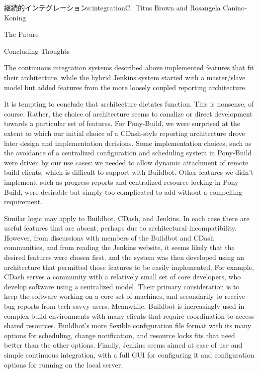 \begin{aosachapter}{継続的インテグレーション}{s:integration}{C.\ Titus Brown and Rosangela Canino-Koning}
\begin{aosasect1}{The Future}
\begin{aosadescription}
\end{aosadescription}

\begin{aosasect2}{Concluding Thoughts}

The continuous integration systems described above implemented
features that fit their architecture, while the hybrid Jenkins system
started with a master/slave model but added features from the more
loosely coupled reporting architecture.

It is tempting to conclude that architecture dictates function. This
is nonsense, of course. Rather, the choice of architecture seems to
canalize or direct development towards a particular set of
features. For Pony-Build, we were surprised at the extent to which our
initial choice of a CDash-style reporting architecture drove later
design and implementation decisions. Some implementation choices, such
as the avoidance of a centralized configuration and scheduling system
in Pony-Build were driven by our use cases: we needed to allow dynamic
attachment of remote build clients, which is difficult to support with
Buildbot. Other features we didn't implement, such as progress reports
and centralized resource locking in Pony-Build, were desirable but
simply too complicated to add without a compelling requirement.

Similar logic may apply to Buildbot, CDash, and Jenkins. In each case
there are useful features that are absent, perhaps due to
architectural incompatibility. However, from discussions with members
of the Buildbot and CDash communities, and from reading the Jenkins
website, it seems likely that the desired features were chosen first,
and the system was then developed using an architecture that permitted
those features to be easily implemented. For example, CDash serves a
community with a relatively small set of core developers, who develop
software using a centralized model. Their primary consideration is to
keep the software working on a core set of machines, and secondarily
to receive bug reports from tech-savvy users. Meanwhile, Buildbot is
increasingly used in complex build environments with many clients that
require coordination to access shared resources. Buildbot's more
flexible configuration file format with its many options for
scheduling, change notification, and resource locks fits that need
better than the other options. Finally, Jenkins seems aimed at ease of
use and simple continuous integration, with a full GUI for configuring
it and configuration options for running on the local server.


\end{aosasect2}
\end{aosasect1}
\end{aosachapter}
